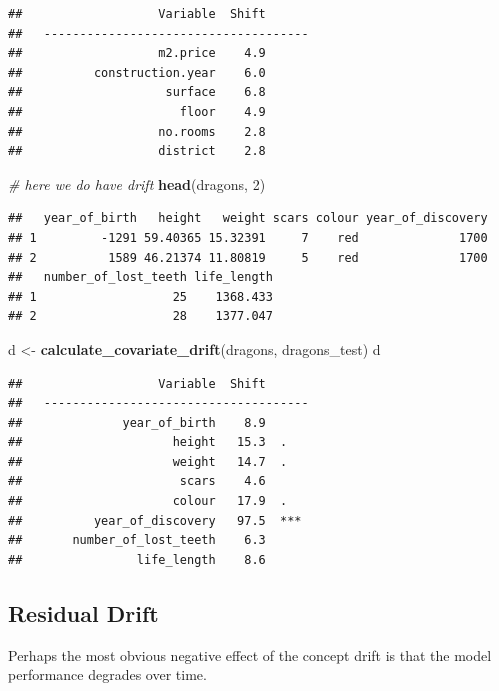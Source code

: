 \documentclass[12pt,]{krantz}
\newenvironment{Shaded}{\begin{snugshade}}{\end{snugshade}}
\newcommand{\CommentTok}[1]{\textcolor[rgb]{0.56,0.35,0.01}{\textit{#1}}}
\newcommand{\DecValTok}[1]{\textcolor[rgb]{0.00,0.00,0.81}{#1}}
\newcommand{\KeywordTok}[1]{\textcolor[rgb]{0.13,0.29,0.53}{\textbf{#1}}}
\newcommand{\NormalTok}[1]{#1}
\newcommand{\StringTok}[1]{\textcolor[rgb]{0.31,0.60,0.02}{#1}}
\theoremstyle{definition}
\theoremstyle{definition}
\theoremstyle{definition}
\theoremstyle{remark}
\begin{document}
\begin{verbatim}
##                   Variable  Shift
##   -------------------------------------
##                   m2.price    4.9  
##          construction.year    6.0  
##                    surface    6.8  
##                      floor    4.9  
##                   no.rooms    2.8  
##                   district    2.8
\end{verbatim}

\begin{Shaded}
\begin{Highlighting}[]
\CommentTok{# here we do have drift}
\KeywordTok{head}\NormalTok{(dragons, }\DecValTok{2}\NormalTok{)}
\end{Highlighting}
\end{Shaded}

\begin{verbatim}
##   year_of_birth   height   weight scars colour year_of_discovery
## 1         -1291 59.40365 15.32391     7    red              1700
## 2          1589 46.21374 11.80819     5    red              1700
##   number_of_lost_teeth life_length
## 1                   25    1368.433
## 2                   28    1377.047
\end{verbatim}

\begin{Shaded}
\begin{Highlighting}[]
\NormalTok{d <-}\StringTok{ }\KeywordTok{calculate_covariate_drift}\NormalTok{(dragons, dragons_test)}
\NormalTok{d}
\end{Highlighting}
\end{Shaded}

\begin{verbatim}
##                   Variable  Shift
##   -------------------------------------
##              year_of_birth    8.9  
##                     height   15.3  .
##                     weight   14.7  .
##                      scars    4.6  
##                     colour   17.9  .
##          year_of_discovery   97.5  ***
##       number_of_lost_teeth    6.3  
##                life_length    8.6
\end{verbatim}

\hypertarget{residual-drift}{%
\subsection{Residual Drift}\label{residual-drift}}

Perhaps the most obvious negative effect of the concept drift is that
the model performance degrades over time.
\end{document}

